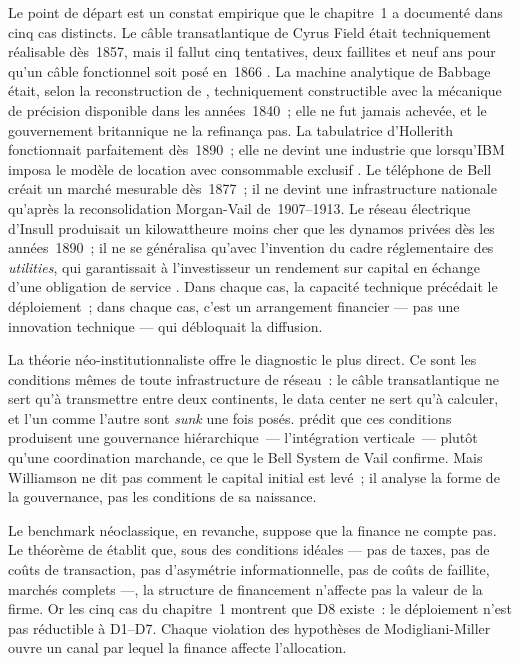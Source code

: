 Le point de départ est un constat empirique que le chapitre~1 a documenté dans cinq cas distincts. Le câble transatlantique de Cyrus Field était techniquement réalisable dès~1857, mais il fallut cinq tentatives, deux faillites et neuf ans pour qu'un câble fonctionnel soit posé en~1866 \parencite{gordon_thread_2002}. La machine analytique de Babbage était, selon la reconstruction de \textcite{swade_difference_2001}, techniquement constructible avec la mécanique de précision disponible dans les années~1840~; elle ne fut jamais achevée, et le gouvernement britannique ne la refinança pas. La tabulatrice d'Hollerith fonctionnait parfaitement dès~1890~; elle ne devint une industrie que lorsqu'IBM imposa le modèle de location avec consommable exclusif \parencite{cortada_before_1993}. Le téléphone de Bell créait un marché mesurable dès~1877~; il ne devint une infrastructure nationale qu'après la reconsolidation Morgan-Vail de~1907--1913. Le réseau électrique d'Insull produisait un kilowattheure moins cher que les dynamos privées dès les années~1890~; il ne se généralisa qu'avec l'invention du cadre réglementaire des \emph{utilities}, qui garantissait à l'investisseur un rendement sur capital en échange d'une obligation de service \parencite{hughes_networks_1983}. Dans chaque cas, la capacité technique précédait le déploiement~; dans chaque cas, c'est un arrangement financier --- pas une innovation technique --- qui débloquait la diffusion.

\markINST La théorie néo-institutionnaliste offre le diagnostic le plus direct.  Ce sont les conditions mêmes de toute infrastructure de réseau~: le câble transatlantique ne sert qu'à transmettre entre deux continents, le data center ne sert qu'à calculer, et l'un comme l'autre sont \emph{sunk} une fois posés. \textcite{williamson_economic_1985} prédit que ces conditions produisent une gouvernance hiérarchique~--- l'intégration verticale~--- plutôt qu'une coordination marchande, ce que le Bell System de Vail confirme. Mais Williamson ne dit pas comment le capital initial est levé~; il analyse la forme de la gouvernance, pas les conditions de sa naissance.

\markNEO Le benchmark néoclassique, en revanche, suppose que la finance ne compte pas. Le théorème de \textcite{modigliani_cost_1958} établit que, sous des conditions idéales --- pas de taxes, pas de coûts de transaction, pas d'asymétrie informationnelle, pas de coûts de faillite, marchés complets ---, la structure de financement n'affecte pas la valeur de la firme.  Or les cinq cas du chapitre~1 montrent que D8 existe~: le déploiement n'est pas réductible à D1--D7. Chaque violation des hypothèses de Modigliani-Miller ouvre un canal par lequel la finance affecte l'allocation.

